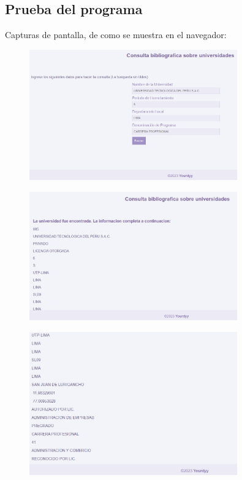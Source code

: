 \subsection{Prueba del programa}
Capturas de pantalla, de como se muestra en el navegador:
\begin{figure}[h!]
    \centering
    \includegraphics[width=0.8\textwidth,keepaspectratio]{img/Prueba1.png}
\end{figure}
\begin{figure}[h!]
    \centering
    \includegraphics[width=0.8\textwidth,keepaspectratio]{img/Prueba2.png}
\end{figure}
\begin{figure}[h!]
    \centering
    \includegraphics[width=0.8\textwidth,keepaspectratio]{img/Prueba3.png}
\end{figure}


